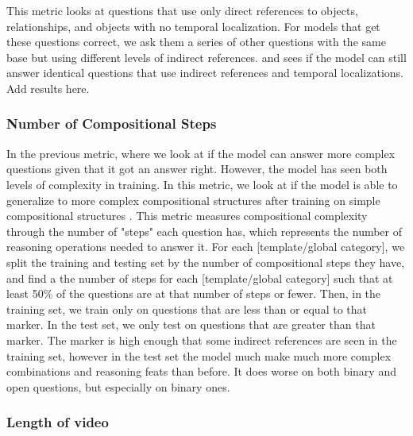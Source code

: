 \documentclass[10pt,twocolumn,letterpaper]{article}
\newcommand{\mgm}[1]{{\color{cyan}{mgm: #1}}}
\begin{document}
This metric looks at questions that use only direct references to objects, relationships, and objects with no temporal localization. For models that get these questions correct, we ask them a series of other questions with the same base but using different levels of indirect references. \mgm{If i do it, say that we only add in indirect references } and sees if the model can still answer identical questions that use indirect references and temporal localizations. Add results here.

\mgm{maybe look at if it can answer questions where the whole indirect reference is masked}

\mgm{This will only be interesting if we fix indirects not affecting accuracy.}

\mgm{May want to make a separate table for this one too }

\subsubsection{Number of Compositional Steps}

In the previous metric, where we look at if the model can answer more complex questions given that it got an answer right. However, the model has seen both levels of complexity in training. In this metric, we look at if the model is able to generalize to more complex compositional structures after training on simple compositional structures \cite{lake2018generalization}. This metric measures compositional complexity through the number of "steps" each question has, which represents the number of reasoning operations needed to answer it. For each [template/global category], we split the training and testing set by the number of compositional steps they have, and find a the number of steps for each [template/global category] such that at least 50\% of the questions are at that number of steps or fewer. Then, in the training set, we train only on questions that are less than or equal to that marker. In the test set, we only test on questions that are greater than that marker. The marker is high enough that some indirect references are seen in the training set, however in the test set the model much make much more complex combinations and reasoning feats than before. It does worse on both binary and open questions, but especially on binary ones.

\subsubsection{Length of video}
\end{document}
